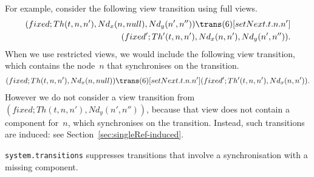 For example, consider the following view transition using full
views.
%
\begin{equation}
\begin{align}
\label{trans:setNext}
(fixed; Th(t, n, n'), Nd_x(n, null), Nd_y(n', n'')) 
  \trans(6)[setNext.t.n.n'] \\
\qquad (fixed'; Th'(t, n, n'), Nd_x(n, n'), Nd_y(n', n'')).
\end{align}
\end{equation}
%
When we use restricted views, we would include the following view transition,
which contains the node~$n$ that synchronises on the transition. 
%
\begin{equation}
\label{trans:setNext-singleRef}
\begin{align}
(fixed; Th(t, n, n'), Nd_x(n, null)) 
  \trans(6)[setNext.t.n.n'] 
 (fixed'; Th'(t, n, n'), Nd_x(n, n')).
\end{align}
\end{equation}
%
However we do not consider a view transition from
$(fixed; Th(t, n, n'), Nd_y(n', n''))$,
because that view does not contain a component for~$n$, which synchronises on
the transition.  Instead, such transitions are induced: see
Section~\ref{sec:singleRef-induced}. 

\begin{impNote}
\texttt{system.transitions} suppresses transitions that involve a
synchronisation with a missing component.
\end{impNote}

